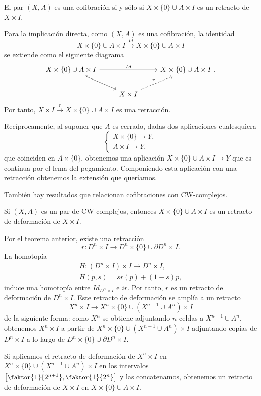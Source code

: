 \begin{teor}
El par $(X, A)$ es una cofibración si y sólo si $X \times \{0\} \cup A \times I$ es un retracto de $X \times I$.
\end{teor}
\begin{demo}
Para la implicación directa, como $(X,A)$ es una cofibración, la identidad 
\[ X \times \{0\} \cup A \times I \stackrel{Id}{\longrightarrow} X \times \{0\} \cup A \times I \]
se extiende como el siguiente diagrama
\[
\begin{tikzcd}
	X \times \{0\} \cup A \times I \arrow{rr}{Id} \drar[hook] & & X \times \{0\} \cup A \times I \ . \\
				& X \times I \urar[dashed]{r} &
\end{tikzcd}
\]
Por tanto, $X \times I \stackrel{r}{\longrightarrow} X \times \{0\} \cup A \times I$ es una retracción. \par
Recíprocamente, al suponer que $A$ es cerrado, dadas dos aplicaciones cualesquiera 
\[ \begin{cases}
X \times \{0\} \longrightarrow Y, \\
A \times I \longrightarrow Y,
\end{cases} \]
que coinciden en $A \times \{0\}$, obtenemos una aplicación $X \times \{0\} \cup A \times I \longrightarrow Y$ que es continua por el lema del pegamiento. Componiendo esta aplicación con una retracción obtenemos la extensión que queríamos.
\end{demo}
También hay resultados que relacionan cofibraciones con CW-complejos.
\begin{teor}
Si $(X, A)$ es un par de CW-complejos, entonces $X \times \{0\} \cup A \times I$ es un retracto de deformación de $X \times I$.
\end{teor}
\begin{demo}
Por el teorema anterior, existe una retracción 
\[r : D^n \times I \longrightarrow D^n \times \{0\} \cup \partial D^n \times I.\] 
La homotopía 
\begin{align*}
H : (D^n \times I) \times I \longrightarrow D^n \times I, \\
H(p, s) = s r(p) + (1-s)p,
\end{align*}
induce una homotopía entre $Id_{D^n \times I} $ e $ir$. Por tanto, $r$ es un retracto de deformación de $D^n \times I$. 
Este retracto de deformación se amplía a un retracto 
\[X^n \times I \longrightarrow X^n \times \{0\} \cup (X^{n-1} \cup A^n) \times I \] de la siguiente forma: como $X^n$ se obtiene adjuntando $n$-celdas a $X^{n-1} \cup A^n$, obtenemos $X^n \times I$ a partir de $X^n \times \{0\} \cup (X^{n-1} \cup A^n) \times I$ adjuntando copias de $D^n \times I$ a lo largo de $D^n \times \{0\} \cup \partial D^n \times I$. \par 
Si aplicamos el retracto de deformación de $X^n \times I$ en $X^n \times \{0\} \cup (X^{n-1} \cup A^n) \times I$ en los intervalos ${\small \left[\faktor{1}{2^{n+1}}, \faktor{1}{2^n}\right]}$ y las concatenamos, obtenemos un retracto de deformación de $X \times I$ en $X \times \{0\} \cup A \times I$.
\end{demo}

